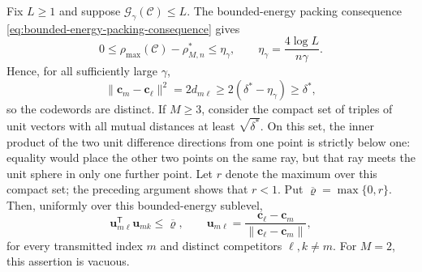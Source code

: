 \documentclass[12pt,draftclsnofoot,onecolumn]{IEEEtran}
\newcommand{\cC}{\mathcal{C}}
\newcommand{\cG}{\mathcal{G}}
\newcommand{\bc}{\bm c}
\newcommand{\bu}{\bm u}
\newcommand{\T}{\mathsf T}
\theoremstyle{definition}
\begin{document}
\begin{IEEEproof}
Fix \(L\ge1\) and suppose \(\cG_\gamma(\cC)\le L\).  The bounded-energy
packing consequence \eqref{eq:bounded-energy-packing-consequence} gives
\begin{equation*}
  0\le\rho_{\max}(\cC)-\rho^{\ast}_{M,n}
  \le\eta_\gamma,
  \qquad
  \eta_\gamma=\frac{4\log L}{n\gamma}.
\end{equation*}
Hence, for all sufficiently large \(\gamma\),
\begin{equation*}
  \|\bc_m-\bc_\ell\|^2=2d_{m\ell}
  \ge2(\delta^{\ast}-\eta_\gamma)\ge\delta^{\ast},
\end{equation*}
so the codewords are distinct.  If \(M\ge3\), consider the compact set of triples of unit
vectors with all mutual distances at least
\(\sqrt{\delta^{\ast}}\).  On this set, the inner product of the two
unit difference directions from one point is strictly below one:
equality would place the other two points on the same ray, but that ray
meets the unit sphere in only one further point.  Let \(r\) denote the
maximum over this compact set; the preceding argument shows that
\(r<1\).  Put
\(\overline\varrho=\max\{0,r\}\).  Then, uniformly over this bounded-energy
sublevel,
\begin{equation*}
  \bu_{m\ell}^{\T}\bu_{mk}\le\overline\varrho,
  \qquad
  \bu_{m\ell}=\frac{\bc_\ell-\bc_m}
  {\|\bc_\ell-\bc_m\|},
\end{equation*}
for every transmitted index \(m\) and distinct competitors
\(\ell,k\ne m\).  For \(M=2\), this assertion is vacuous.


\end{IEEEproof}
\end{document}
